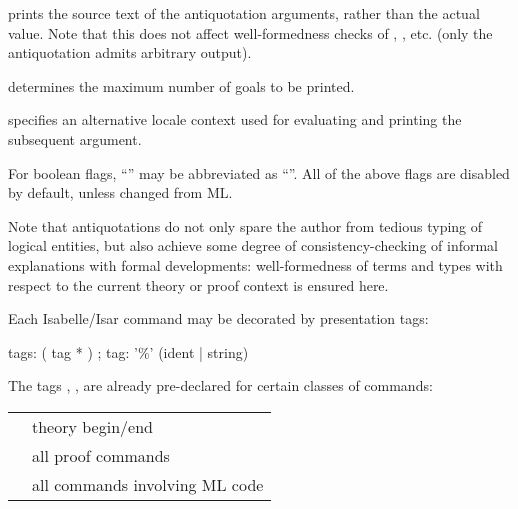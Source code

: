 \begin{isabellebody}
\begin{isamarkuptext}
\begin{descr}
  \item[\isa{{\isachardoublequote}source\ {\isacharequal}\ bool{\isachardoublequote}}] prints the source text of the
  antiquotation arguments, rather than the actual value.  Note that
  this does not affect well-formedness checks of \hyperlink{antiquotation.thm}{\mbox{}}, \hyperlink{antiquotation.term}{\mbox{}}, etc. (only the \hyperlink{antiquotation.text}{\mbox{}} antiquotation admits arbitrary output).

  \item[\isa{{\isachardoublequote}goals{\isacharunderscore}limit\ {\isacharequal}\ nat{\isachardoublequote}}] determines the maximum number of
  goals to be printed.

  \item[\isa{{\isachardoublequote}locale\ {\isacharequal}\ name{\isachardoublequote}}] specifies an alternative locale
  context used for evaluating and printing the subsequent argument.

  \end{descr}

  For boolean flags, ``'' may be abbreviated as
  ``''.  All of the above flags are disabled by default,
  unless changed from ML.

  \medskip Note that antiquotations do not only spare the author from
  tedious typing of logical entities, but also achieve some degree of
  consistency-checking of informal explanations with formal
  developments: well-formedness of terms and types with respect to the
  current theory or proof context is ensured here.%
\end{isamarkuptext}%
\isamarkuptrue%
%
\isamarkuptrue%
%
\begin{isamarkuptext}%
Each Isabelle/Isar command may be decorated by presentation tags:

  \begin{rail}
    tags: ( tag * )
    ;
    tag: '\%' (ident | string)
  \end{rail}

  The tags , ,  are already
  pre-declared for certain classes of commands:

 \medskip

  \begin{tabular}{ll}
    \isa{{\isachardoublequote}theory{\isachardoublequote}} & theory begin/end \\
    \isa{{\isachardoublequote}proof{\isachardoublequote}} & all proof commands \\
    \isa{{\isachardoublequote}ML{\isachardoublequote}} & all commands involving ML code \\
  \end{tabular}


\end{isamarkuptext}
\end{isabellebody}
